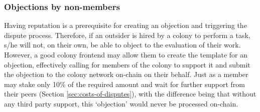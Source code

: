 \subsubsection{Objections by non-members}

Having reputation is a prerequisite for creating an objection and triggering the dispute process. Therefore, if an outsider is hired by a colony to perform a task, s/he will not, on their own, be able to object to the evaluation of their work.
However, a good colony frontend may allow them to create the template for an objection, effectively calling for members of the colony to support it and submit the objection to the colony network on-chain on their behalf.  
Just as a member may stake only 10\% of the required amount and wait for further support from their peers (Section \ref{sec:costs-of-disputes}), with the difference being that without any third party support, this `objection' would never be processed on-chain.

% 
% 

